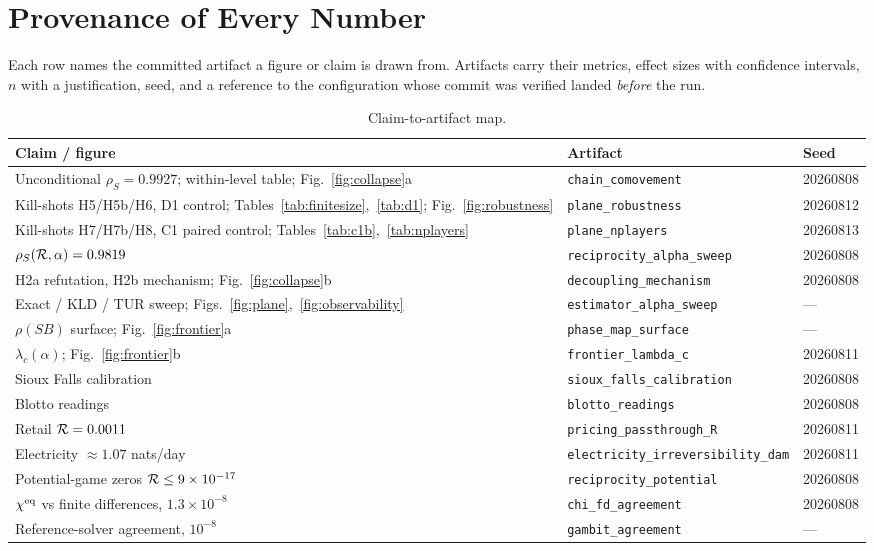 \section{Provenance of Every Number}
\label{app:prov}

Each row names the committed artifact a figure or claim is drawn from. Artifacts carry their
metrics, effect sizes with confidence intervals, $n$ with a justification, seed, and a
reference to the configuration whose commit was verified landed \emph{before} the run.

\begin{table}[H]
\caption{Claim-to-artifact map.}
\label{tab:prov}
\small
\begin{tabular}{lll}
\toprule
\textbf{Claim / figure} & \textbf{Artifact} & \textbf{Seed} \\
\midrule
Unconditional $\rho_S=0.9927$; within-level table; Fig.~\ref{fig:collapse}a & \texttt{chain\_comovement} & 20260808 \\
Kill-shots H5/H5b/H6, D1 control; Tables~\ref{tab:finitesize},~\ref{tab:d1}; Fig.~\ref{fig:robustness} & \texttt{plane\_robustness} & 20260812 \\
Kill-shots H7/H7b/H8, C1 paired control; Tables~\ref{tab:c1b},~\ref{tab:nplayers} & \texttt{plane\_nplayers} & 20260813 \\
$\rho_S(\mathcal{R},\alpha)=0.9819$ & \texttt{reciprocity\_alpha\_sweep} & 20260808 \\
H2a refutation, H2b mechanism; Fig.~\ref{fig:collapse}b & \texttt{decoupling\_mechanism} & 20260808 \\
Exact / KLD / TUR sweep; Figs.~\ref{fig:plane},~\ref{fig:observability} & \texttt{estimator\_alpha\_sweep} & --- \\
$\rho(SB)$ surface; Fig.~\ref{fig:frontier}a & \texttt{phase\_map\_surface} & --- \\
$\lambda_c(\alpha)$; Fig.~\ref{fig:frontier}b & \texttt{frontier\_lambda\_c} & 20260811 \\
Sioux Falls calibration & \texttt{sioux\_falls\_calibration} & 20260808 \\
Blotto readings & \texttt{blotto\_readings} & 20260808 \\
Retail $\mathcal{R}=0.0011$ & \texttt{pricing\_passthrough\_R} & 20260811 \\
Electricity $\approx1.07$ nats/day & \texttt{electricity\_irreversibility\_dam} & 20260811 \\
Potential-game zeros $\mathcal{R}\le9\times10^{-17}$ & \texttt{reciprocity\_potential} & 20260808 \\
$\chi^{\mathrm{eq}}$ vs finite differences, $1.3\times10^{-8}$ & \texttt{chi\_fd\_agreement} & 20260808 \\
Reference-solver agreement, $10^{-8}$ & \texttt{gambit\_agreement} & --- \\
\bottomrule
\end{tabular}
\end{table}

